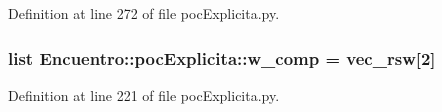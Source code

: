 \-Definition at line 272 of file poc\-Explicita.\-py.

\subsubsection[{w\-\_\-comp}]{\setlength{\rightskip}{0pt plus 5cm}list {\bf \-Encuentro\-::poc\-Explicita\-::w\-\_\-comp} = vec\-\_\-rsw[2]}\label{namespace_encuentro_1_1poc_explicita_afc783f689f82b362d252c91e762ca9b2}


\-Definition at line 221 of file poc\-Explicita.\-py.

